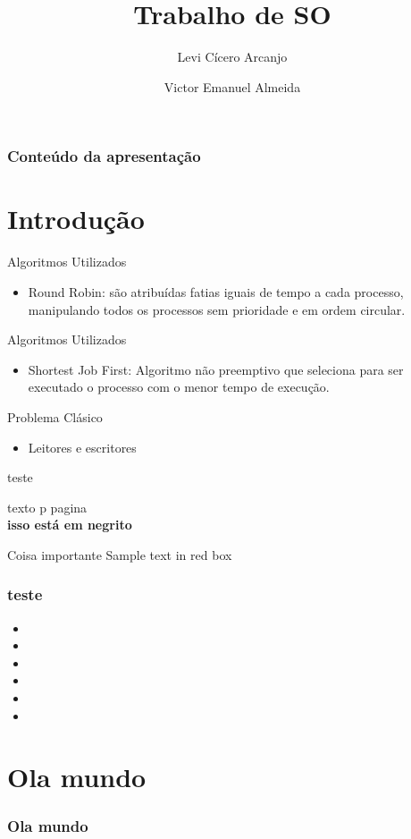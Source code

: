 \documentclass{beamer}
\author[Levi, Victor]{Levi Cícero Arcanjo  \and Victor Emanuel Almeida}
\title{Trabalho de SO}
\begin{document}
	\frame{\titlepage}
	\begin{frame}
		\frametitle{Conteúdo da apresentação}
		\tableofcontents
	\end{frame}
	\section{Introdução}

\begin{frame}{Algoritmos Utilizados}
    
	\begin{itemize}
		\item Round Robin: são atribuídas fatias iguais de tempo a cada processo, manipulando todos os processos sem prioridade e em ordem circular.
	\end{itemize}
\end{frame}

\begin{frame}{Algoritmos Utilizados}
    
	\begin{itemize}
		\item Shortest Job First: Algoritmo não preemptivo que seleciona para ser executado o processo com o menor tempo de execução.
	\end{itemize}
\end{frame}

\begin{frame}{Problema Clásico}
    
	\begin{itemize}
		\item Leitores e escritores
	\end{itemize}
\end{frame}


\begin{frame}
	teste
	
\end{frame}

	\begin{frame}
		texto p pagina \thepage\\
		\textbf{isso está em negrito}

		\begin{alertblock}{Coisa importante}
			Sample text in red box
		\end{alertblock}
	\end{frame}

	\begin{frame}
		\frametitle{teste}
		\begin{itemize}
			\item 
			\item 
			\item 
			\item 
			\item 
			\item 
		\end{itemize}
	\end{frame}
	\section{Ola mundo}
	\begin{frame}
		\frametitle{Ola mundo}
	\end{frame}
\end{document}
